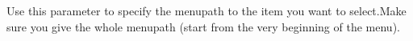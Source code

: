Use this parameter to specify the menupath to the item you want to select.Make sure you give the whole menupath (start from the very beginning of the menu). 
 





  
